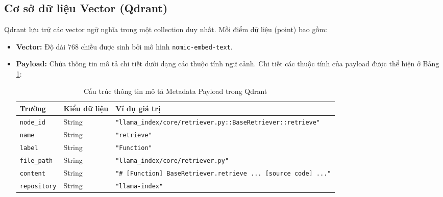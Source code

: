 \documentclass[12pt,a4paper,oneside]{report}
\begin{document}
\subsection{Cơ sở dữ liệu Vector (Qdrant)}
Qdrant lưu trữ các vector ngữ nghĩa trong một collection duy nhất. Mỗi điểm dữ liệu (point) bao gồm:
\begin{itemize}
    \item \textbf{Vector:} Độ dài 768 chiều được sinh bởi mô hình \texttt{nomic-embed-text}.
    \item \textbf{Payload:} Chứa thông tin mô tả chi tiết dưới dạng các thuộc tính ngữ cảnh. Chi tiết các thuộc tính của payload được thể hiện ở Bảng \ref{tab:qdrant_payload_vi}:
    \begin{table}[h]
        \centering
        \caption{Cấu trúc thông tin mô tả Metadata Payload trong Qdrant}
        \label{tab:qdrant_payload_vi}
        \begin{tabular}{lll}
            \toprule
            \textbf{Trường} & \textbf{Kiểu dữ liệu} & \textbf{Ví dụ giá trị} \\
            \midrule
            \texttt{node\_id} & String & \texttt{"llama\_index/core/retriever.py::BaseRetriever::retrieve"} \\
            \texttt{name} & String & \texttt{"retrieve"} \\
            \texttt{label} & String & \texttt{"Function"} \\
            \texttt{file\_path} & String & \texttt{"llama\_index/core/retriever.py"} \\
            \texttt{content} & String & \texttt{"\# [Function] BaseRetriever.retrieve ... [source code] ..."} \\
            \texttt{repository} & String & \texttt{"llama-index"} \\
            \bottomrule
        \end{tabular}
    \end{table}
\end{itemize}
\end{document}
